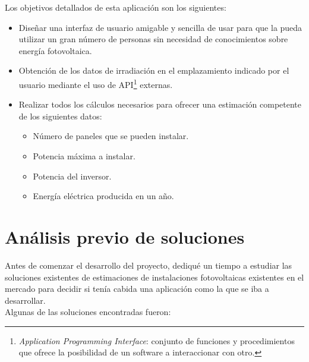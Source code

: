 \documentclass[11pt]{report}
\begin{document}
Los objetivos detallados de esta aplicación son los siguientes:
\begin{itemize}
\item Diseñar una interfaz de usuario amigable y sencilla de usar para que la pueda utilizar un gran número de personas sin necesidad de conocimientos sobre energía fotovoltaica.

\item Obtención de los datos de irradiación en el emplazamiento indicado por el usuario mediante el uso de API\footnote{\textit{Application Programming Interface}: conjunto de funciones y procedimientos que ofrece la posibilidad de un software a interaccionar con otro.} externas.
\item Realizar todos los cálculos necesarios para ofrecer una estimación competente de los siguientes datos:

\begin{itemize}

\item Número de paneles que se pueden instalar.
\item Potencia máxima a instalar.
\item Potencia del inversor.
\item Energía eléctrica producida en un año.

\end{itemize}
\end{itemize}
\newpage

\section{Análisis previo de soluciones}

Antes de comenzar el desarrollo del proyecto, dediqué un tiempo a estudiar las soluciones existentes de estimaciones de instalaciones fotovoltaicas existentes en el mercado para decidir si tenía cabida una aplicación como la que se iba a desarrollar.\\

Algunas de las soluciones encontradas fueron:
\end{document}
